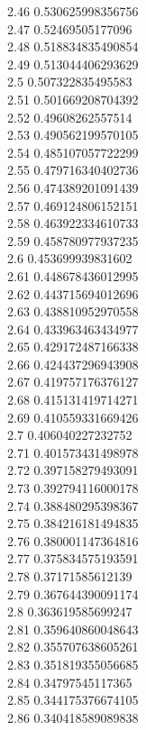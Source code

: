 {2.46	0.530625998356756\\
2.47	0.52469505177096\\
2.48	0.518834835490854\\
2.49	0.513044406293629\\
2.5	0.507322835495583\\
2.51	0.501669208704392\\
2.52	0.49608262557514\\
2.53	0.490562199570105\\
2.54	0.485107057722299\\
2.55	0.479716340402736\\
2.56	0.474389201091439\\
2.57	0.469124806152151\\
2.58	0.463922334610733\\
2.59	0.458780977937235\\
2.6	0.453699939831602\\
2.61	0.448678436012995\\
2.62	0.443715694012696\\
2.63	0.438810952970558\\
2.64	0.433963463434977\\
2.65	0.429172487166338\\
2.66	0.424437296943908\\
2.67	0.419757176376127\\
2.68	0.415131419714271\\
2.69	0.410559331669426\\
2.7	0.406040227232752\\
2.71	0.401573431498978\\
2.72	0.397158279493091\\
2.73	0.392794116000178\\
2.74	0.388480295398367\\
2.75	0.384216181494835\\
2.76	0.380001147364816\\
2.77	0.375834575193591\\
2.78	0.37171585612139\\
2.79	0.367644390091174\\
2.8	0.363619585699247\\
2.81	0.359640860048643\\
2.82	0.355707638605261\\
2.83	0.351819355056685\\
2.84	0.34797545117365\\
2.85	0.344175376674105\\
2.86	0.340418589089838\\
}
